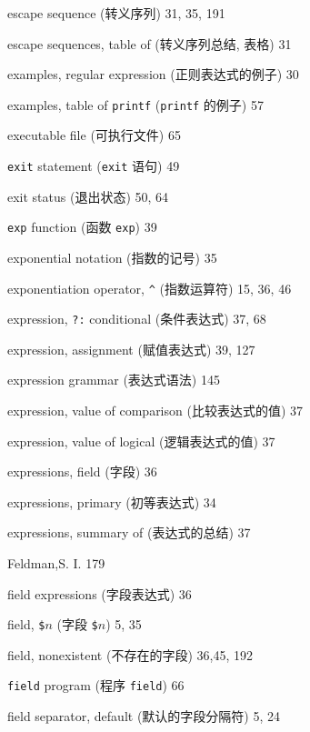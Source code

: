 \begin{multicols}{2}
\hangindent=2pc  escape sequence (转义序列) 31, 35, 191

\hangindent=2pc  escape sequences, table of (转义序列总结,
表格) 31

\hangindent=2pc  examples, regular expression (正则表达式的例子) 30

\hangindent=2pc  examples, table of \verb'printf'
(\verb'printf' 的例子) 57

\hangindent=2pc  executable file (可执行文件) 65

\hangindent=2pc  \verb'exit' statement (\verb'exit' 语句) 49

\hangindent=2pc  exit status (退出状态) 50, 64

\hangindent=2pc  \verb'exp' function (函数 \verb'exp') 39

\hangindent=2pc  exponential notation (指数的记号) 35

\hangindent=2pc  exponentiation operator, \verb'^' (指数运算符)
15, 36, 46

\hangindent=2pc  expression, \verb'?:' conditional (条件表达式)
37, 68

\hangindent=2pc  expression, assignment (赋值表达式) 39, 127

\hangindent=2pc  expression grammar (表达式语法) 145

\hangindent=2pc  expression, value of comparison (比较表达式的值) 37

\hangindent=2pc  expression, value of logical (逻辑表达式的值) 37

\hangindent=2pc  expressions, field (字段) 36

\hangindent=2pc  expressions, primary (初等表达式) 34

\hangindent=2pc  expressions, summary of (表达式的总结) 37

\hangindent=2pc  Feldman,S. I. 179

\hangindent=2pc  field expressions (字段表达式) 36

\hangindent=2pc  field, \verb'$'$n$ (字段 \verb'$'$n$) 5, 35

\hangindent=2pc  field, nonexistent (不存在的字段) 36,45, 192

\hangindent=2pc  \verb'field' program (程序 \verb'field') 66

\hangindent=2pc  field separator, default (默认的字段分隔符) 5, 24


\end{multicols}
